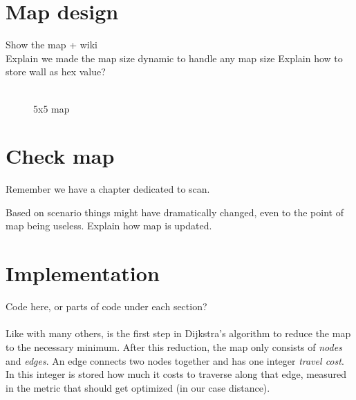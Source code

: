\section{Map design}
\label{sec:map_design} %
Show the map + wiki\\
Explain we made the map size dynamic to handle any map size
Explain how to store wall as hex value?\\
\\
\begin{figure}[htp]
    \centering
    \hspace{0.2\textwidth}
    \caption{5x5 map}
    \label{fig:5x5map}
\end{figure}

\section{Check map}
\label{sec:map_check} %
Remember we have a chapter dedicated to scan.

Based on scenario things might have dramatically changed, even to the point of map being useless. Explain how map is updated.

\section{Implementation}
\label{sec:map} %
Code here, or parts of code under each section?\\
\\
Like with many others,
is the first step in Dijkstra's algorithm to reduce the map to the necessary minimum.
After this reduction, the map only consists of \emph{nodes} and \emph{edges}.
An edge connects two nodes together and has one integer \emph{travel cost}.
In this integer is stored how much it costs to traverse along that edge,
measured in the metric that should get optimized (in our case distance).


